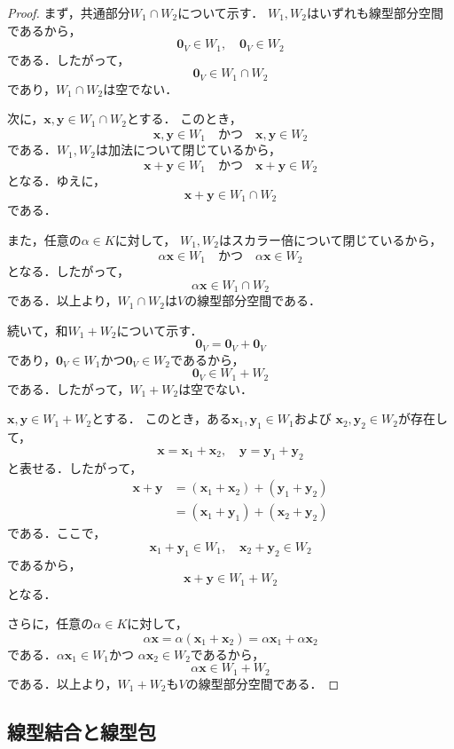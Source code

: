 \begin{leftbar}
\begin{proof}
  まず，共通部分$W_1\cap W_2$について示す．
  $W_1,W_2$はいずれも線型部分空間であるから，
  \[
    \bm{0}_V\in W_1,
    \quad
    \bm{0}_V\in W_2
  \]
  である．したがって，
  \[
    \bm{0}_V\in W_1\cap W_2
  \]
  であり，$W_1\cap W_2$は空でない．

  次に，$\bm{x},\bm{y}\in W_1\cap W_2$とする．
  このとき，
  \[
    \bm{x},\bm{y}\in W_1
    \quad\text{かつ}\quad
    \bm{x},\bm{y}\in W_2
  \]
  である．$W_1,W_2$は加法について閉じているから，
  \[
    \bm{x}+\bm{y}\in W_1
    \quad\text{かつ}\quad
    \bm{x}+\bm{y}\in W_2
  \]
  となる．ゆえに，
  \[
    \bm{x}+\bm{y}\in W_1\cap W_2
  \]
  である．

  また，任意の$\alpha\in K$に対して，
  $W_1,W_2$はスカラー倍について閉じているから，
  \[
    \alpha\bm{x}\in W_1
    \quad\text{かつ}\quad
    \alpha\bm{x}\in W_2
  \]
  となる．したがって，
  \[
    \alpha\bm{x}\in W_1\cap W_2
  \]
  である．以上より，$W_1\cap W_2$は$V$の線型部分空間である．

  続いて，和$W_1+W_2$について示す．
  \[
    \bm{0}_V=\bm{0}_V+\bm{0}_V
  \]
  であり，$\bm{0}_V\in W_1$かつ$\bm{0}_V\in W_2$であるから，
  \[
    \bm{0}_V\in W_1+W_2
  \]
  である．したがって，$W_1+W_2$は空でない．

  $\bm{x},\bm{y}\in W_1+W_2$とする．
  このとき，ある$\bm{x}_1,\bm{y}_1\in W_1$および
  $\bm{x}_2,\bm{y}_2\in W_2$が存在して，
  \[
    \bm{x}=\bm{x}_1+\bm{x}_2,
    \quad
    \bm{y}=\bm{y}_1+\bm{y}_2
  \]
  と表せる．したがって，
  \begin{align*}
    \bm{x}+\bm{y}
    &=(\bm{x}_1+\bm{x}_2)+(\bm{y}_1+\bm{y}_2)\\
    &=(\bm{x}_1+\bm{y}_1)+(\bm{x}_2+\bm{y}_2)
  \end{align*}
  である．ここで，
  \[
    \bm{x}_1+\bm{y}_1\in W_1,
    \quad
    \bm{x}_2+\bm{y}_2\in W_2
  \]
  であるから，
  \[
    \bm{x}+\bm{y}\in W_1+W_2
  \]
  となる．

  さらに，任意の$\alpha\in K$に対して，
  \[
    \alpha\bm{x}
    =\alpha(\bm{x}_1+\bm{x}_2)
    =\alpha\bm{x}_1+\alpha\bm{x}_2
  \]
  である．$\alpha\bm{x}_1\in W_1$かつ
  $\alpha\bm{x}_2\in W_2$であるから，
  \[
    \alpha\bm{x}\in W_1+W_2
  \]
  である．以上より，$W_1+W_2$も$V$の線型部分空間である．
\end{proof}
\end{leftbar}

\subsection{線型結合と線型包}

